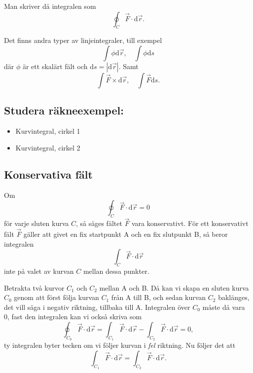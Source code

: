 \documentclass[%
oneside,                 %
final,                   %
10pt]{article}
\newenvironment{warning_mdfboxadmon}[1][]{
\begin{warning_mdfboxmdframed}[frametitle=#1]
}
{
\end{warning_mdfboxmdframed}
}
\begin{document}
\vspace{6mm}



Man skriver då integralen som
\begin{equation}
  \oint_C \vec{F} \cdot \mbox{d}\vec{r}.
\end{equation}

Det finns andra typer av linjeintegraler, till exempel
\begin{equation}
  \int \phi \mbox{d}\vec{r}, \quad \int \phi \mbox{d}s
\end{equation}
där $\phi$ är ett skalärt fält och $\mbox{d}s = | \mbox{d}\vec{r} | $. Samt
\begin{equation}
  \int \vec{F} \times \mbox{d}\vec{r}, \quad \int \vec{F} \mbox{d}s.
\end{equation}

\subsection*{Studera räkneexempel:}
\begin{itemize}
\item Kurvintegral, cirkel 1

\item Kurvintegral, cirkel 2
\end{itemize}

\noindent
\subsection*{Konservativa fält}
Om 
\begin{equation}
  \oint_C \vec{F} \cdot\mbox{d}\vec{r} = 0
\end{equation}
för varje sluten kurva $C$, så säges fältet $\vec{F}$ vara konservativt.  För ett konservativt fält $\vec{F}$ gäller att givet en fix startpunkt A och en fix slutpunkt B, så beror integralen
\begin{equation}
  \int_C \vec{F} \cdot\mbox{d}\vec{r}
\end{equation}
inte på valet av kurvan $C$ mellan dessa punkter.  


\begin{warning_mdfboxadmon}[Bevis]
Betrakta två kurvor $C_1$ och $C_2$ mellan A och B.  Då kan vi skapa en sluten kurva $C_0$ genom att först följa kurvan $C_1$ från A till B, och sedan kurvan $C_2$ baklänges, det vill säga i negativ riktning, tillbaka till A. Integralen över $C_0$ måste då vara 0, fast den integralen kan vi också skriva som
\begin{equation}
  \oint_{C_0} \vec{F} \cdot\mbox{d}\vec{r} = \int_{C_1} 
\vec{F} \cdot\mbox{d}\vec{r} - \int_{C_2} \vec{F} \cdot\mbox{d}\vec{r} = 0,
\end{equation}
ty integralen byter tecken om vi följer kurvan i \emph{fel} riktning. Nu följer det att 
\begin{equation}
  \int_{C_1} \vec{F} \cdot\mbox{d}\vec{r} = \int_{C_2} \vec{F} \cdot\mbox{d}
\vec{r}.
\end{equation}
\end{warning_mdfboxadmon} %
\end{document}
